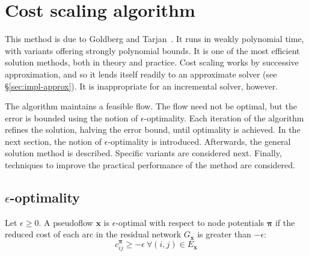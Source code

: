 \section{Cost scaling algorithm} \label{sec:impl-cost-scaling}

This method is due to Goldberg and Tarjan~\cite{Goldberg:1987}. It runs in weakly polynomial time, with variants offering strongly polynomial bounds. It is one of the most efficient solution methods, both in theory and practice\footnotemark. Cost scaling works by successive approximation, and so it lends itself readily to an approximate solver (see \S\ref{sec:impl-approx}). It is inappropriate for an incremental solver, however.

The algorithm maintains a feasible flow. The flow need not be optimal, but the error is bounded using the notion of $\epsilon$-optimality. Each iteration of the algorithm refines the solution, halving the error bound, until optimality is achieved. In the next section, the notion of $\epsilon$-optimality is introduced. Afterwards, the general solution method is described. Specific variants are considered next. Finally, techniques to improve the practical performance of the method are considered.

\subsection{$\epsilon$-optimality}

\begin{defn} \label{defn:epsilon-optimality}
Let $\epsilon \geq 0$. A pseudoflow $\mathbf{x}$ is $\epsilon$-optimal with respect to node potentials $\boldsymbol{\pi}$ if the reduced cost of each arc in the residual network $G_\mathbf{x}$ is greater than $-\epsilon$:
\begin{equation} \label{eq:epsilon-optimality}
c^{\boldsymbol{\pi}}_{ij} \geq -\epsilon\:\forall (i,j) \in E_{\mathbf{x}}
\end{equation}
\end{defn}

